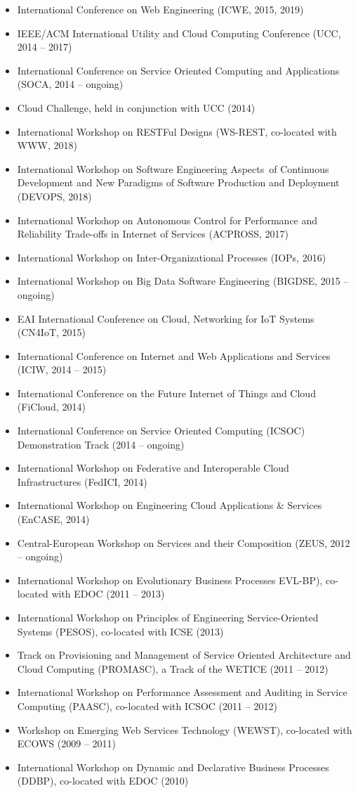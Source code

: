 \documentclass[paper=letter,fontsize=11pt]{scrartcl} %
\begin{document}
\begin{itemize}
  \item International Conference on Web Engineering (ICWE, 2015, 2019)
  \item IEEE/ACM International Utility and Cloud Computing Conference (UCC, 2014 -- 2017)
  \item International Conference on Service Oriented Computing and Applications (SOCA, 2014 -- ongoing)
	\item Cloud Challenge, held in conjunction with UCC (2014)
	\item International Workshop on RESTFul Designs (WS-REST, co-located with WWW, 2018)
	\item International Workshop on Software Engineering Aspects of Continuous Development and New Paradigms of Software Production and Deployment (DEVOPS, 2018)
  \item International Workshop on Autonomous Control for Performance and Reliability Trade-offs in Internet of Services (ACPROSS, 2017)
	\item International Workshop on Inter-Organizational Processes (IOPs, 2016)
    \item  International Workshop on Big Data Software Engineering (BIGDSE, 2015 -- ongoing)
  \item EAI International Conference on Cloud, Networking for IoT Systems (CN4IoT, 2015)
  \item International Conference on Internet and Web Applications and Services (ICIW, 2014 -- 2015)
  \item International Conference on the Future Internet of Things and Cloud (FiCloud, 2014)
    \item International Conference on Service Oriented Computing (ICSOC) Demonstration Track (2014 -- ongoing)
    \item International Workshop on Federative and Interoperable Cloud Infrastructures (FedICI, 2014)
    \item International Workshop on Engineering Cloud Applications \& Services (EnCASE, 2014)
  \item Central-European Workshop on Services and their Composition (ZEUS, 2012 -- ongoing)
  \item International Workshop on Evolutionary Business Processes EVL-BP), co-located with EDOC (2011 -- 2013)
  \item International Workshop on Principles of Engineering Service-Oriented Systems (PESOS), co-located with ICSE (2013)
  \item Track on Provisioning and Management of Service Oriented Architecture and Cloud Computing (PROMASC), a Track of the WETICE (2011 -- 2012)
  \item International Workshop on Performance Assessment and Auditing in Service Computing (PAASC), co-located with ICSOC (2011 -- 2012)
  \item Workshop on Emerging Web Services Technology (WEWST), co-located
  with ECOWS (2009 -- 2011)
  \item International Workshop on Dynamic and Declarative Business
  Processes (DDBP), co-located with EDOC (2010)
\end{itemize}
\end{document}
